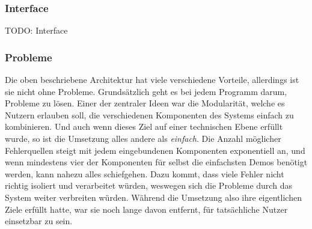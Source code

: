 \documentclass[11pt]{article}
\begin{document}
\subsubsection{Interface}
\label{sec:orgd7b1235}
TODO: Interface
\subsubsection{Probleme}
\label{sec:orgd10d8b8}
Die oben beschriebene Architektur hat viele verschiedene Vorteile,
allerdings ist sie nicht ohne Probleme. Grundsätzlich geht es bei
jedem Programm darum, Probleme zu lösen. Einer der zentraler Ideen war
die Modularität, welche es Nutzern erlauben soll, die verschiedenen
Komponenten des Systems einfach zu kombinieren. Und auch wenn dieses
Ziel auf einer technischen Ebene erfüllt wurde, so ist die Umsetzung
alles andere als \emph{einfach}. Die Anzahl möglicher Fehlerquellen steigt
mit jedem eingebundenen Komponenten exponentiell an, und wenn
mindestens vier der Komponenten für selbst die einfachsten Demos
benötigt werden, kann nahezu alles schiefgehen. Dazu kommt, dass viele
Fehler nicht richtig isoliert und verarbeitet würden, weswegen sich
die Probleme durch das System weiter verbreiten würden. Während die
Umsetzung also ihre eigentlichen Ziele erfüllt hatte, war sie noch
lange davon entfernt, für tatsächliche Nutzer einsetzbar zu sein.\\
\end{document}
